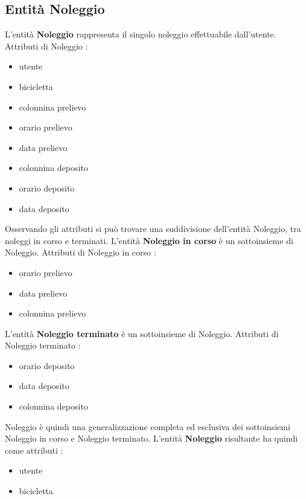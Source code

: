 \documentclass[a4paper,twoside]{article}
\begin{document}
\subsection{Entità Noleggio}
L'entità \textbf{Noleggio} rappresenta il singolo noleggio effettuabile dall'utente.\newline
Attributi di Noleggio :
\begin{itemize}
 \item utente
 \item bicicletta
 \item colonnina prelievo
 \item orario prelievo
 \item data prelievo
 \item colonnina deposito
 \item orario deposito
 \item data deposito
\end{itemize}
Osservando gli attributi si può trovare una suddivisione dell'entità Noleggio, tra noleggi in corso e terminati.\newline
L'entità \textbf{Noleggio in corso} è un sottoinsieme di Noleggio.\newline
Attributi di Noleggio in corso :
\begin{itemize}
 \item orario prelievo
 \item data prelievo
 \item colonnina prelievo
\end{itemize}
L'entità \textbf{Noleggio terminato} è un sottoinsieme di Noleggio.\newline
Attributi di Noleggio terminato :
\begin{itemize}
 \item orario deposito
 \item data deposito
 \item colonnina deposito
\end{itemize}
Noleggio è quindi una generalizzazione completa ed esclusiva dei sottoinsiemi Noleggio in corso e Noleggio terminato.\newline
L'entità \textbf{Noleggio} risultante ha quindi come attributi :
\begin{itemize}
 \item utente
 \item bicicletta
\end{itemize}
\end{document}

